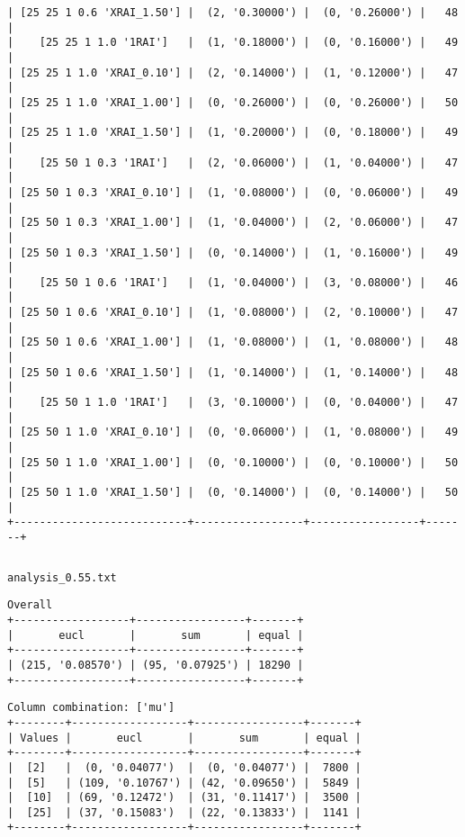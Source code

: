 \documentclass{article}
\begin{document}
\begin{verbatim}
| [25 25 1 0.6 'XRAI_1.50'] |  (2, '0.30000') |  (0, '0.26000') |   48  |
|    [25 25 1 1.0 '1RAI']   |  (1, '0.18000') |  (0, '0.16000') |   49  |
| [25 25 1 1.0 'XRAI_0.10'] |  (2, '0.14000') |  (1, '0.12000') |   47  |
| [25 25 1 1.0 'XRAI_1.00'] |  (0, '0.26000') |  (0, '0.26000') |   50  |
| [25 25 1 1.0 'XRAI_1.50'] |  (1, '0.20000') |  (0, '0.18000') |   49  |
|    [25 50 1 0.3 '1RAI']   |  (2, '0.06000') |  (1, '0.04000') |   47  |
| [25 50 1 0.3 'XRAI_0.10'] |  (1, '0.08000') |  (0, '0.06000') |   49  |
| [25 50 1 0.3 'XRAI_1.00'] |  (1, '0.04000') |  (2, '0.06000') |   47  |
| [25 50 1 0.3 'XRAI_1.50'] |  (0, '0.14000') |  (1, '0.16000') |   49  |
|    [25 50 1 0.6 '1RAI']   |  (1, '0.04000') |  (3, '0.08000') |   46  |
| [25 50 1 0.6 'XRAI_0.10'] |  (1, '0.08000') |  (2, '0.10000') |   47  |
| [25 50 1 0.6 'XRAI_1.00'] |  (1, '0.08000') |  (1, '0.08000') |   48  |
| [25 50 1 0.6 'XRAI_1.50'] |  (1, '0.14000') |  (1, '0.14000') |   48  |
|    [25 50 1 1.0 '1RAI']   |  (3, '0.10000') |  (0, '0.04000') |   47  |
| [25 50 1 1.0 'XRAI_0.10'] |  (0, '0.06000') |  (1, '0.08000') |   49  |
| [25 50 1 1.0 'XRAI_1.00'] |  (0, '0.10000') |  (0, '0.10000') |   50  |
| [25 50 1 1.0 'XRAI_1.50'] |  (0, '0.14000') |  (0, '0.14000') |   50  |
+---------------------------+-----------------+-----------------+-------+
\end{verbatim}

\begin{verbatim}

\end{verbatim}

\newpage
\verb|analysis_0.55.txt|
\begin{verbatim}
Overall
+------------------+-----------------+-------+
|       eucl       |       sum       | equal |
+------------------+-----------------+-------+
| (215, '0.08570') | (95, '0.07925') | 18290 |
+------------------+-----------------+-------+
\end{verbatim}

\begin{verbatim}
Column combination: ['mu']
+--------+------------------+-----------------+-------+
| Values |       eucl       |       sum       | equal |
+--------+------------------+-----------------+-------+
|  [2]   |  (0, '0.04077')  |  (0, '0.04077') |  7800 |
|  [5]   | (109, '0.10767') | (42, '0.09650') |  5849 |
|  [10]  | (69, '0.12472')  | (31, '0.11417') |  3500 |
|  [25]  | (37, '0.15083')  | (22, '0.13833') |  1141 |
+--------+------------------+-----------------+-------+
\end{verbatim}
\end{document}
